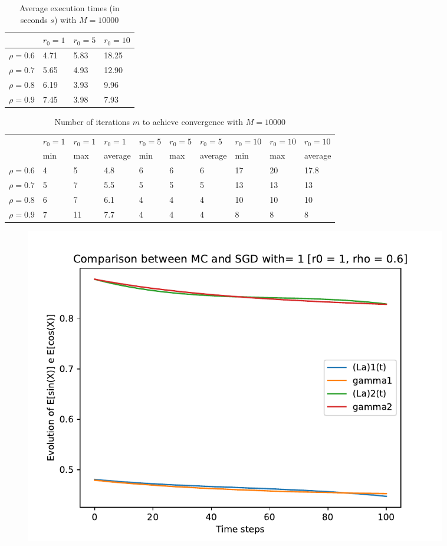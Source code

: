 \documentclass[a4paper,11pt,openright]{report}
\begin{document}
\begin{table}[H]
\centering
\addtolength{\leftskip}{-1.5cm}
\addtolength{\rightskip}{-1.5cm}
\begin{tabular}{|c|lll|}
\hline
$ $ & $r_0 = 1$ & $r_0 = 5$ & $r_0 = 10$ \\
\hline
$\rho = 0.6$ & 4.71 & 5.83 & 18.25 \\

$\rho = 0.7$ & 5.65 & 4.93 & 12.90 \\

$\rho = 0.8$ & 6.19 & 3.93 & 9.96 \\

$\rho = 0.9$ & 7.45 & 3.98 & 7.93 \\
\hline
\end{tabular}
\caption{Average execution
 times (in seconds $s$) with $M = 10000$}
\end{table}
\begin{table}[H]
\centering
\addtolength{\leftskip}{-1.5cm}
\addtolength{\rightskip}{-1.5cm}
\begin{tabular}{|c|lllllllll|}
\hline
$ $ & $r_0 = 1$ & $r_0 = 1$ & $r_0 = 1$ & $r_0 = 5$ & $r_0 = 5$ & $r_0 = 5$ & $r_0 = 10$ & $r_0 = 10$ & $r_0 = 10$  \\
$ $ & min & max & average & min & max & average & min & max & average \\ 
\hline
$\rho = 0.6$ & 4 & 5 & 4.8 & 6 & 6 & 6 & 17 & 20 & 17.8 \\

$\rho = 0.7$ & 5 & 7 & 5.5 & 5 & 5 & 5 & 13 & 13 & 13\\

$\rho = 0.8$ & 6 & 7 & 6.1 & 4 & 4 & 4 & 10 & 10 & 10\\

$\rho = 0.9$ & 7 & 11 & 7.7 & 4 & 4 & 4 & 8 & 8 & 8\\
\hline
\end{tabular}
\caption{Number of iterations $m$ to achieve convergence with $M = 10000$}
\end{table}
\begin{figure}[H]
\centering
\includegraphics[width=0.9\textwidth]{images/graphs T = 1/n = 3, M = 1 sine and cosine.pdf}
\end{figure}
\end{document}

